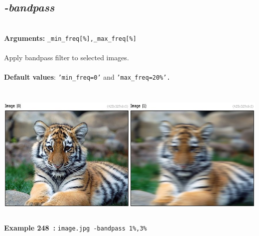 \documentclass[a4paper,11pt,twoside]{book}
\begin{document}
\subsection{\emph{-bandpass} }\vspace*{-0.5em}
~\\\textbf{Arguments: } 
{\small \texttt{\_min\_freq[\%],\_max\_freq[\%]}}\\~\\
Apply bandpass filter to selected images.
~\\~\\\textbf{Default values}: {\small \texttt{'min\_freq=0'} and \texttt{'max\_freq=20\%'.}}
\begin{center}\includegraphics[keepaspectratio=true,height=7cm,width=\textwidth]{img/gmic_def248.jpg}\\
{\footnotesize \textbf{Example 248~:} \texttt{image.jpg -bandpass 1\%,3\%}}
\end{center}
\end{document}
